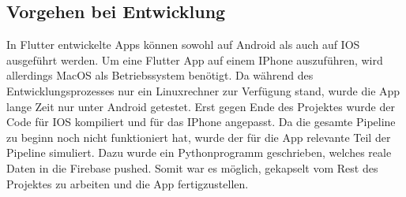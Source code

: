 \subsection{Vorgehen bei Entwicklung}
In Flutter entwickelte Apps können sowohl auf Android als auch auf IOS ausgeführt werden. 
Um eine Flutter App auf einem IPhone auszuführen, wird allerdings MacOS als Betriebssystem benötigt. 
Da während des Entwicklungsprozesses nur ein Linuxrechner zur Verfügung stand, wurde die App lange Zeit nur unter
Android getestet. 
Erst gegen Ende des Projektes wurde der Code für IOS kompiliert und für das IPhone angepasst.  
Da die gesamte Pipeline zu beginn noch nicht funktioniert hat, wurde der für die App relevante Teil der Pipeline simuliert.
Dazu wurde ein Pythonprogramm geschrieben, welches reale Daten in die Firebase pushed. 
Somit war es möglich, gekapselt vom Rest des Projektes zu arbeiten und die App fertigzustellen.


    

